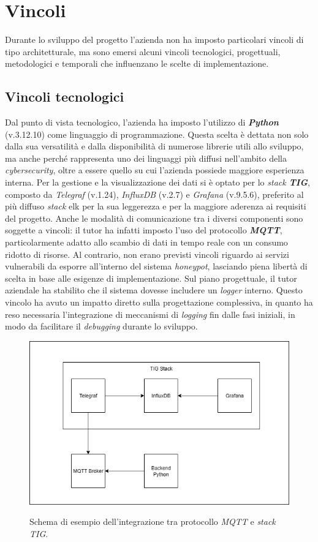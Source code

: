 \section{Vincoli}
Durante lo sviluppo del progetto l'azienda non ha imposto particolari vincoli di tipo architetturale, ma sono emersi alcuni vincoli tecnologici, progettuali, metodologici e temporali che influenzano le scelte di implementazione. 
\subsection{Vincoli tecnologici}
Dal punto di vista tecnologico, l'azienda ha imposto l'utilizzo di \textbf{\textit{Python}} (v.3.12.10) come linguaggio di programmazione. Questa scelta è dettata non solo dalla sua versatilità e dalla disponibilità di numerose librerie utili allo sviluppo, ma anche perché rappresenta uno dei linguaggi più diffusi nell'ambito della \textit{cybersecurity}, oltre a essere quello su cui l'azienda possiede maggiore esperienza interna. Per la gestione e la visualizzazione dei dati si è optato per lo \textit{stack \textbf{TIG}}, composto da \textit{Telegraf} (v.1.24), \textit{InfluxDB} (v.2.7) e \textit{Grafana} (v.9.5.6), preferito al più diffuso \textit{stack} \gls{elk} per la sua leggerezza e per la maggiore aderenza ai requisiti del progetto. Anche le modalità di comunicazione tra i diversi componenti sono soggette a vincoli: il tutor ha infatti imposto l'uso del protocollo \textit{\textbf{MQTT}}, particolarmente adatto allo scambio di dati in tempo reale con un consumo ridotto di risorse. Al contrario, non erano previsti vincoli riguardo ai servizi vulnerabili da esporre all'interno del sistema \textit{honeypot}, lasciando piena libertà di scelta in base alle esigenze di implementazione. 
Sul piano progettuale, il tutor aziendale ha stabilito che il sistema dovesse includere un \textit{logger} interno. Questo vincolo ha avuto un impatto diretto sulla progettazione complessiva, in quanto ha reso necessaria l'integrazione di meccanismi di \textit{logging} fin dalle fasi iniziali, in modo da facilitare il \textit{debugging} durante lo sviluppo.
\begin{figure}[H]
    \centering
    \includegraphics[alt={Schema MQTT-TIG}, width=\columnwidth]{img/mqtt-tig.png}
    \caption{Schema di esempio dell'integrazione tra protocollo \textit{MQTT} e \textit{stack} \textit{TIG}.}
    \label{fig:mqtt-tig}
\end{figure}
